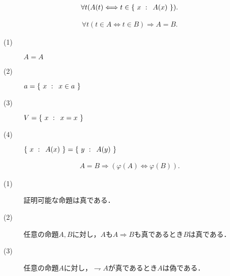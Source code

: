 	
	\begin{screen}
		\begin{axm}[類の公理]
			\begin{align}
				\forall t(A(t) \Longleftrightarrow t \in \left\{\ x\, \, : \, \, \, A(x)\ \right\}).
			\end{align}
		\end{axm}
	\end{screen}
	
	\begin{screen}
		\begin{axm}[外延性の公理]
			\begin{align}
				\forall t(t \in A  \Longleftrightarrow t \in B)
				\Longrightarrow A=B.
			\end{align}
		\end{axm}
	\end{screen}
	
	\begin{screen}
		\begin{thm}
			\begin{description}
				\item[(1)] $A=A$
				\item[(2)] $a = \left\{\ x\, \, : \, \, \, x \in a\ \right\}$
				\item[(3)] $V=\left\{\ x\, \, : \, \, \, x=x\ \right\}$
				\item[(4)] $\left\{\ x\, \, : \, \, \, A(x)\ \right\} = \left\{\ y\, \, : \, \, \, A(y)\ \right\}$
			\end{description}
		\end{thm}
	\end{screen}
	
	\begin{screen}
		\begin{axm}[相等性の公理]
			\begin{align}
				A=B \Longrightarrow (\varphi(A) \Longleftrightarrow \varphi(B)).
			\end{align}
		\end{axm}
	\end{screen}
	
	\begin{screen}
		\begin{axm}[論理の公理]\mbox{}
			\begin{description}
				\item[(1)] 証明可能な命題は真である．
				\item[(2)] 任意の命題$A,B$に対し，$A$も$A \Longrightarrow B$も真であるとき$B$は真である．
				\item[(3)] 任意の命題$A$に対し，$\rightharpoondown A$が真であるとき$A$は偽である．
			\end{description}
		\end{axm}
	\end{screen}
	

